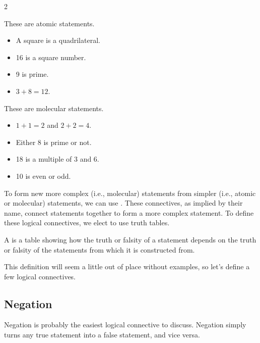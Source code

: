 \begin{example}
    \vspace{-4mm}
    \begin{multicols}{2}
        {
            These are atomic statements.
            \begin{itemize}
                \item A square is a quadrilateral.
                \item 16 is a square number.
                \item 9 is prime.
                \item $3 + 8 = 12$.
            \end{itemize}
        }
        {
            These are molecular statements.
            \begin{itemize}
                \item $1 + 1 = 2$ and $2 + 2 = 4$.
                \item Either 8 is prime or not.
                \item 18 is a multiple of 3 and 6.
                \item 10 is even or odd.
            \end{itemize}
        }
    \end{multicols}
\end{example}

To form new more complex (i.e., molecular) statements from simpler (i.e., atomic or molecular) statements, we can use . These connectives, as implied by their name, connect statements together to form a more complex statement. To define these logical connectives, we elect to use truth tables.

\begin{definition}
    A  is a table showing how the truth or falsity of a statement depends on the truth or falsity of the statements from which it is constructed from.
\end{definition}

This definition will seem a little out of place without examples, so let's define a few logical connectives.

\subsection{Negation}
Negation is probably the easiest logical connective to discuss. Negation simply turns any true statement into a false statement, and vice versa.

